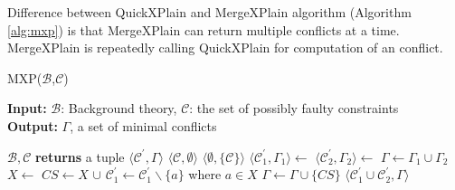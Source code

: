 \documentclass[12pt,a4paper]{article}
\begin{document}
Difference between QuickXPlain and MergeXPlain algorithm (Algorithm \ref{alg:mxp}) is that MergeXPlain can return multiple conflicts at a time. MergeXPlain is repeatedly calling QuickXPlain for computation of an conflict.

\begin{algorithm}[H]
	\footnotesize
	\caption{MXP($\mathcal{B}$,$\mathcal{C}$)}
	\label{alg:mxp}
	\textbf{Input:} $\mathcal{B}$: Background theory, $\mathcal{C}$: the set of possibly faulty constraints  \\
	\textbf{Output:} $\Gamma$, a set of minimal conflicts
	\begin{algorithmic}[1]
		\State {}
		\State \Return {$\emptyset$}
		\EndIf
		\State \Return {$\Gamma$}
		
		\medskip
		 {$\mathcal{B}, \mathcal{C}$} \textbf{returns} a tuple $\langle \mathcal{C}^{\prime}, \Gamma \rangle$
		\State \Return $\langle \mathcal{C}, \emptyset \rangle$
		\State \Return $\langle \emptyset, \{\mathcal{C}\} \rangle$
		\EndIf
		\State $\langle \mathcal{C}_{1}^{\prime}, \Gamma_{1} \rangle \gets$ 
		\State $\langle \mathcal{C}_{2}^{\prime}, \Gamma_{2} \rangle \gets$ 
		\State $\Gamma \gets \Gamma_{1} \cup \Gamma_{2}$
		\State $X \gets $ 
		\State $CS \gets X$ $\cup$ 
		\State $\mathcal{C}_{1}^{\prime} \gets \mathcal{C}_{1}^{\prime} \backslash \{a\}$ where $a \in X$
		\State $\Gamma \gets \Gamma \cup \{CS\}$
		\EndWhile
		\State \Return $\langle \mathcal{C}_{1}^{\prime} \cup \mathcal{C}_{2}^{\prime}, \Gamma \rangle$
		\EndFunction			
	\end{algorithmic}
\end{algorithm}
\end{document}
